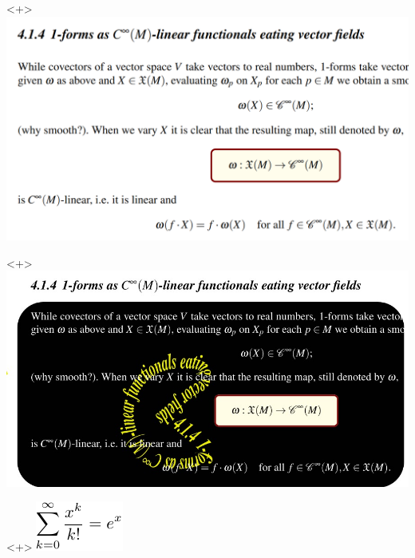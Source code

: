 \unless\ifishandout
\begin{frame}
    \begin{onlyenv}<+>
        \includegraphics[width=\textwidth,height=0.8\textheight,keepaspectratio]{assets/pacman-before.png}
    \end{onlyenv}
    \begin{onlyenv}<+>
        \includegraphics[width=\textwidth,height=0.8\textheight,keepaspectratio]{assets/pacman.jpg}
    \end{onlyenv}
    \begin{onlyenv}<+>
        \includegraphics[width=\textwidth,height=0.8\textheight,keepaspectratio]{assets/document-standalone.pdf}

\end{onlyenv}
\end{frame}
